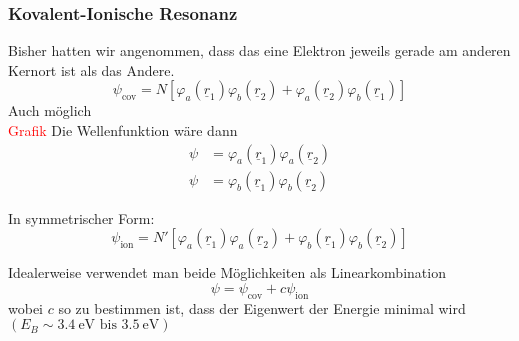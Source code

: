 \subsubsection{Kovalent-Ionische Resonanz}
Bisher hatten wir angenommen, dass das eine Elektron jeweils gerade am anderen Kernort ist als das Andere.\\
\begin{equation}
	\label{3.54}
	\psi_{\text{cov}} = N\left[ \varphi_{a} \left( \underline{r}_{1} \right) \varphi_{b} \left( \underline{r}_{2} \right) + \varphi_{a} \left( \underline{r}_{2} \right) \varphi_{b} \left( \underline{r}_{1} \right)  \right] 
\end{equation} 
Auch möglich\\
\textcolor{red}{Grafik}
Die Wellenfunktion wäre dann
\begin{align}
	\label{3.55}
	\psi&= \varphi_{a} \left( \underline{r}_{1} \right) \varphi_{a}\left( \underline{r}_{2} \right) \\
	\psi&= \varphi_{b}\left( \underline{r}_{1} \right) \varphi_{b}\left( \underline{r}_{2} \right) 
\end{align}

In symmetrischer Form:
\begin{equation}
	\psi_{\text{ion}} = N' \left[ \varphi_{a}\left( \underline{r}_{1} \right) \varphi_{a}\left( \underline{r}_{2} \right) + \varphi_{b} \left( \underline{r}_{1} \right) \varphi_{b} \left( \underline{r}_{2} \right)  \right] 
\end{equation}

Idealerweise verwendet man beide Möglichkeiten als Linearkombination
\begin{equation}
	\label{3.58}
	\psi = \psi_{\text{cov}} + c \psi_{\text{ion}} 
\end{equation}
wobei $c$ so zu bestimmen ist, dass der Eigenwert der Energie minimal wird $\left( E_{B} \sim \SI{3,4}{\electronvolt} \text{ bis } \SI{3,5}{\electronvolt} \right) $
